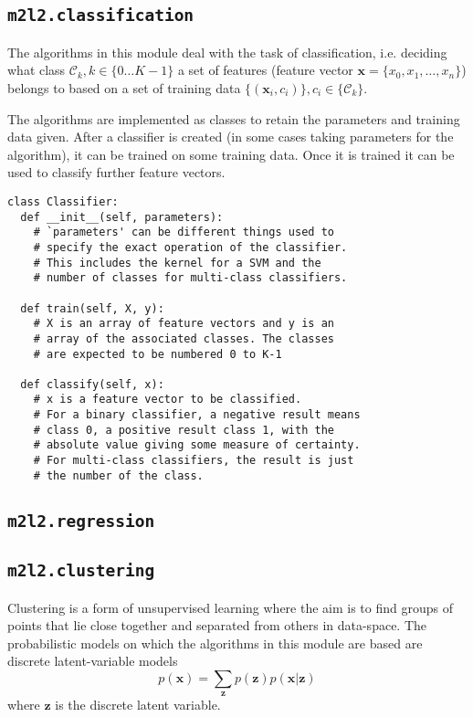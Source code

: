 \documentclass[a4paper]{article}
\begin{document}
\subsection{\texttt{m2l2.classification}}
The algorithms in this module deal with the task of classification, i.e. deciding what class $\mathcal{C}_k, k \in \{0 \ldots K-1\}$ a set of features (feature vector $\mathbf{x} = \{x_0, x_1, \ldots, x_n\}$) belongs to based on a set of training data $\{(\mathbf{x}_i, c_i)\}, c_i \in \{\mathcal{C}_k\}$.

The algorithms are implemented as classes to retain the parameters and training data given. After a classifier is created (in some cases taking parameters for the algorithm), it can be trained on some training data. Once it is trained it can be used to classify further feature vectors.

\begin{lstlisting}[frame=TLbr,breaklines=true]
class Classifier:
  def __init__(self, parameters):
    # `parameters' can be different things used to
    # specify the exact operation of the classifier.
    # This includes the kernel for a SVM and the
    # number of classes for multi-class classifiers.
  
  def train(self, X, y):
    # X is an array of feature vectors and y is an
    # array of the associated classes. The classes
    # are expected to be numbered 0 to K-1
  
  def classify(self, x):
    # x is a feature vector to be classified.
    # For a binary classifier, a negative result means
    # class 0, a positive result class 1, with the
    # absolute value giving some measure of certainty.
    # For multi-class classifiers, the result is just
    # the number of the class.
\end{lstlisting}

\subsection{\texttt{m2l2.regression}}

\subsection{\texttt{m2l2.clustering}}
Clustering is a form of unsupervised learning where the aim is to find groups of points that lie close together and separated from others in data-space. The probabilistic models on which the algorithms in this module are based are discrete latent-variable models
\[ p(\mathbf{x}) = \sum_\mathbf{z} p(\mathbf{z}) p(\mathbf{x} | \mathbf{z}) \]
where $\mathbf{z}$ is the discrete latent variable.
\end{document}
